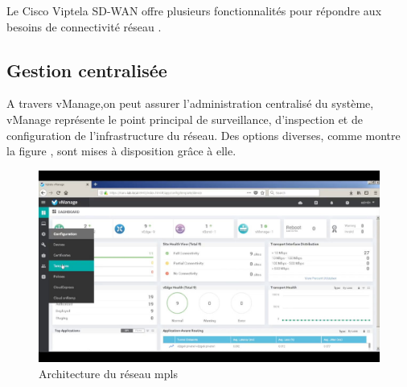 Le Cisco Viptela SD-WAN offre  plusieurs fonctionnalités pour répondre aux besoins de connectivité réseau .
\subsection{Gestion centralisée  }

A travers vManage,on peut assurer l’administration centralisé du système, vManage représente le point principal de surveillance, d'inspection et de configuration de l'infrastructure du réseau. Des options diverses, comme montre la figure , sont mises à disposition grâce à elle.
\begin{figure} [H]
	\begin{center}
		\centering
		\hspace*{-0.5cm}
	\includegraphics{../image/Vmanage}
	\end{center}
	\caption{Architecture du réseau mpls}
\end{figure} 
